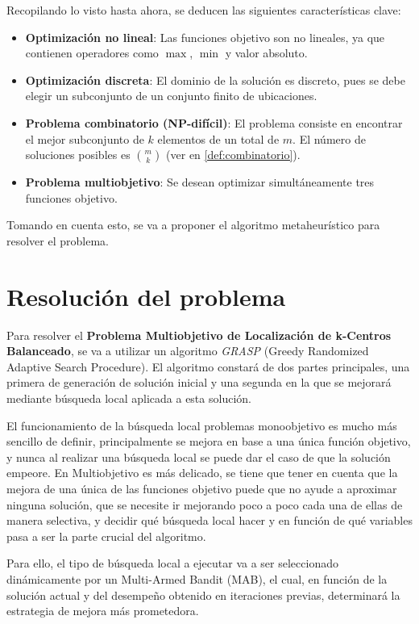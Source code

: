 \documentclass[12pt,a4paper]{book}
\begin{document}
Recopilando lo visto hasta ahora, se deducen las siguientes características clave:

\begin{itemize}
    \item \textbf{Optimización no lineal}: Las funciones objetivo son no lineales, ya que contienen operadores como $\max$, $\min$ y valor absoluto.
    
    \item \textbf{Optimización discreta}: El dominio de la solución es discreto, pues se debe elegir un subconjunto de un conjunto finito de ubicaciones.
    
    \item \textbf{Problema combinatorio (NP-difícil)}: El problema consiste en encontrar el mejor subconjunto de $k$ elementos de un total de $m$. El número de soluciones posibles es $\binom{m}{k}$ (ver en \ref{def:combinatorio}).
    
    \item \textbf{Problema multiobjetivo}: Se desean optimizar simultáneamente tres funciones objetivo.
\end{itemize}

Tomando en cuenta esto, se va a proponer el algoritmo metaheurístico para resolver el problema.


\chapter{Resolución del problema}
Para resolver el \textbf{Problema Multiobjetivo de Localización de k-Centros Balanceado}, se va a utilizar un algoritmo \textit{GRASP} (Greedy Randomized Adaptive Search Procedure).
El algoritmo constará de dos partes principales, una primera de generación de solución inicial y una segunda en la que se mejorará mediante búsqueda local aplicada a esta solución.

El funcionamiento de la búsqueda local problemas monoobjetivo es mucho más sencillo de definir, principalmente se mejora en base a una única función objetivo, y nunca al realizar una búsqueda local se puede dar el caso de que la solución empeore. En Multiobjetivo es más delicado,
se tiene que tener en cuenta que la mejora de una única de las funciones objetivo puede que no ayude a aproximar ninguna solución, que se necesite ir mejorando poco a poco cada una de ellas de manera selectiva, y decidir qué búsqueda local hacer y en función de qué variables pasa
a ser la parte crucial del algoritmo.

Para ello, el tipo de búsqueda local a ejecutar va a ser seleccionado dinámicamente por un Multi-Armed Bandit (MAB), el cual, en función de la solución actual y del desempeño obtenido en iteraciones previas, determinará la estrategia de mejora más prometedora.
\end{document}
